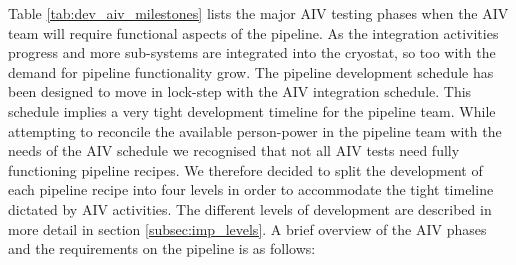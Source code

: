 \documentclass[a4paper]{spie}  %
\begin{document}
Table \ref{tab:dev_aiv_milestones} lists the major AIV testing phases when the AIV team will require functional aspects of the pipeline. 
As the integration activities progress and more sub-systems are integrated into the cryostat, so too with the demand for pipeline functionality grow. 
The pipeline development schedule has been designed to move in lock-step with the AIV integration schedule.
This schedule implies a very tight development timeline for the pipeline team.
While attempting to reconcile the available person-power in the pipeline team with the needs of the AIV schedule we recognised that not all AIV tests need fully functioning pipeline recipes. 
We therefore decided to split the development of each pipeline recipe into four levels in order to accommodate the tight timeline dictated by AIV activities.
The different levels of development are described in more detail in section \ref{subsec:imp_levels}.
A brief overview of the AIV phases and the requirements on the pipeline is as follows:
\end{document}
